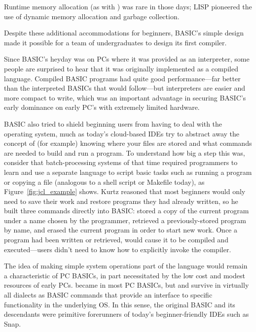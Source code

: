 \begin{tangent}
Runtime memory allocation (as with ) was rare in
those days; LISP pioneered the use of dynamic memory allocation and
garbage collection.
\end{tangent}

Despite these additional accommodations for beginners,
BASIC's simple design made it possible for a team of undergraduates to
design its first compiler.

\begin{tangent}
  Since BASIC's heyday was on PCs where it was provided as an
  interpreter, some people are surprised to hear that it was originally
  implemented as a compiled language.  Compiled BASIC programs had quite
  good performance---far better than the interpreted BASICs that would
  follow---but interpreters are easier and more compact to write, which
  was an important advantage in securing BASIC's early dominance on
  early PC's with extremely limited hardware.
\end{tangent}

BASIC also tried to shield beginning users from having to deal with
the operating system, much as today's cloud-based IDEs try
to abstract away the concept of (for example) knowing where your files
are stored and what commands are needed to build and run a program.
To understand how big a step this was, consider that batch-processing
systems of that time required programmers to learn and use a separate
 language to script basic tasks such as 
running a program or copying a file (analogous to a shell script or
Makefile today), as 
Figure~\ref{fig:jcl_example} shows.
Kurtz reasoned that most beginners would only need
to save their work and restore programs they
had already written, so he built three commands directly into BASIC:
stored a copy of the current program under a name chosen by the
programmer,   retrieved a
previously-stored program by name, and  erased the current program in
order to start new work.
Once a program had been written or retrieved,  would cause it to
be compiled and executed---users didn't need to know how to explicitly
invoke the compiler.

The idea of making simple system operations part of the language would
remain a characteristic of PC BASICs, in part necessitated by the low
cost and modest resources of early PCs.   became  in
most PC BASICs, but  and  survive in virtually all
dialects as BASIC commands that provide an interface to specific
functionality in the underlying OS.  In this sense, the original BASIC
and its descendants were primitive forerunners of today's
beginner-friendly IDEs such as Snap.

